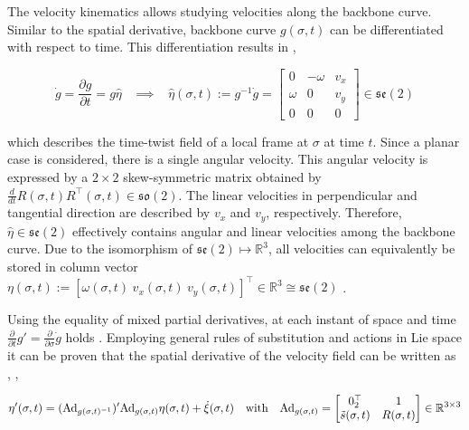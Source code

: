 The velocity kinematics allows studying velocities along the backbone curve. Similar to the spatial derivative, backbone curve $g(\sigma,t)$ can be differentiated with respect to time. This differentiation results in \cite{Caasenbrood2020}, 

\begin{equation}
  \Dot{g} = \frac{\partial g}{\partial t} = g \hat{\eta} \hspace{10pt} \implies \hspace{10pt}  \hat{\eta}(\sigma,t) := g^{-1}\dot{g} = \begin{bmatrix} 0 & -\omega & v_x \\ \omega & 0 & v_y \\
  0& 0 & 0 \end{bmatrix} \in  \mathfrak{se}(2)
    \label{eq2:dgdt}
\end{equation}

which describes the time-twist field of a local frame at $\sigma$ at time $t$. Since a planar case is considered, there is a single angular velocity. This angular velocity is expressed by a $2 \times 2$ skew-symmetric matrix obtained by $\frac{d}{dt}R(\sigma,t)R^\top(\sigma,t) \in \mathfrak{so}(2)$. The linear velocities in perpendicular and tangential direction are described by $v_x$ and $v_y$, respectively. Therefore, $\hat{\eta} \in \mathfrak{se}(2)$ effectively contains angular and linear velocities among the backbone curve. Due to the isomorphism of $\mathfrak{se}(2) \longmapsto \mathbb{R}^3$, all velocities can equivalently be stored in column vector $\eta(\sigma,t) := [\omega(\sigma,t) \hspace{3pt} v_x(\sigma,t) \hspace{3pt} v_y(\sigma,t)]^\top \in \mathbb{R}^3 \cong \mathfrak{se}(2)$ \cite{Sola2018}.


Using the equality of mixed partial derivatives, at each instant of space and time $\frac{\partial}{\partial t}g' = \frac{\partial}{\partial \sigma}\dot{g}$ holds \cite{Caasenbrood2020}. Employing general rules of substitution and actions in Lie space it can be proven that the spatial derivative of the velocity field can be written as  \textcolor{blue}{\cite{Caasenbrood2020}}, \cite{Boyer2019},

\begin{equation}
    \eta'(\sigma,t)= (\text{Ad}_{g(\sigma,t)^{-1}})'\text{Ad}_{g(\sigma,t)} \eta(\sigma,t) + \Dot{\xi}(\sigma,t) \hspace{10pt} \text{with} \hspace{10pt} \text{Ad}_{g(\sigma,t)} = \begin{bmatrix} 0_2^\top & 1 \\ \Tilde{s}(\sigma,t) & R(\sigma,t)  \end{bmatrix} \in \mathbb{R}^{3\times 3}
    \label{eq2:etadif}
\end{equation}


